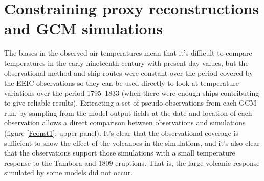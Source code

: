 \documentclass[CP]{copernicus}
\begin{document}
\section{Constraining proxy reconstructions and GCM simulations}

The biases in the observed air temperatures mean that it's difficult to compare temperatures in the early nineteenth century with present day values, but the observational method and ship routes were constant over the period covered by the EEIC observations so they can be used directly to look at temperature variations over the period 1795--1833 (when there were enough ships contributing to give reliable results). Extracting a set of pseudo-observations from each GCM run, by sampling from the model output fields at the date and location of each observation allows a direct comparison between observations and simulations (figure \ref{Fconst1}: upper panel). It's clear that the observational coverage is sufficient to show the effect of the volcanoes in the simulations, and it's also clear that the observations support those simulations with a small temperature response to the Tambora and 1809 eruptions. That is, the large volcanic response simulated by some models did not occur.
\end{document}
